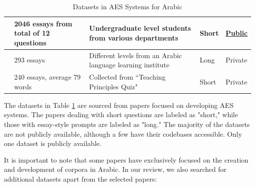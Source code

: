 \documentclass{article}
\begin{document}
\begin{table}
\begin{tabularx}{7in}{|c|X|p{1.5in}|p{1cm}|p{1.5cm}|}
			\textcite{23_ghazawi2024bert} & 2046 essays from total of 12 questions & Undergraduate level students from various departments & Short & \href{https://osf.io/dp2nh/?view_only=4ac6373c60214ea6952855f81507fec7}{Public} \\ \hline
			\textcite{26_alsanie2022threelevels} & 293 essays & Different levels from an Arabic language learning institute & Long & Private \\ \hline
			\textcite{27_gaheen2021jaya} & 240 essays, average 79 words & Collected from ``Teaching Principles Quiz" & Short & Private \\ \hline
		\end{tabularx}
		\caption{Datasets in AES Systems for Arabic}
		\label{arabicdatasets}
	\end{table}
	The datasets in Table \ref{arabicdatasets} are sourced from papers focused on developing AES systems. The papers dealing with short questions are labeled as "short," while those with essay-style prompts are labeled as "long." The majority of the datasets are not publicly available, although a few have their codebases accessible. Only one dataset is publicly available. 
	
	It is important to note that some papers have exclusively focused on the creation and development of corpora in Arabic. In our review, we also searched for additional datasets apart from the selected papers:
	
	
\end{document}
